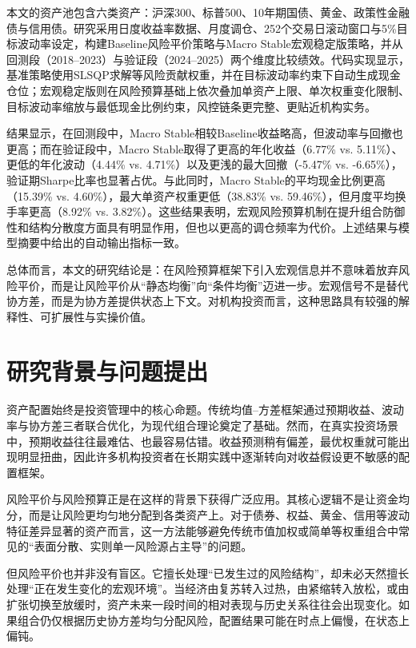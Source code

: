 \documentclass[12pt,a4paper]{ctexart}
\begin{document}
本文的资产池包含六类资产：沪深300、标普500、10年期国债、黄金、政策性金融债与信用债。研究采用日度收益率数据、月度调仓、252个交易日滚动窗口与5\%目标波动率设定，构建Baseline风险平价策略与Macro Stable宏观稳定版策略，并从回测段（2018--2023）与验证段（2024--2025）两个维度比较绩效。代码实现显示，基准策略使用SLSQP求解等风险贡献权重，并在目标波动率约束下自动生成现金仓位；宏观稳定版则在风险预算基础上依次叠加单资产上限、单次权重变化限制、目标波动率缩放与最低现金比例约束，风控链条更完整、更贴近机构实务。

结果显示，在回测段中，Macro Stable相较Baseline收益略高，但波动率与回撤也更高；而在验证段中，Macro Stable取得了更高的年化收益（6.77\% vs. 5.11\%）、更低的年化波动（4.44\% vs. 4.71\%）以及更浅的最大回撤（-5.47\% vs. -6.65\%），验证期Sharpe比率也显著占优。与此同时，Macro Stable的平均现金比例更高（15.39\% vs. 4.60\%），最大单资产权重更低（38.83\% vs. 59.46\%），但月度平均换手率更高（8.92\% vs. 3.82\%）。这些结果表明，宏观风险预算机制在提升组合防御性和结构分散度方面具有明显作用，但也以更高的调仓频率为代价。上述结果与模型摘要中给出的自动输出指标一致。

总体而言，本文的研究结论是：在风险预算框架下引入宏观信息并不意味着放弃风险平价，而是让风险平价从“静态均衡”向“条件均衡”迈进一步。宏观信号不是替代协方差，而是为协方差提供状态上下文。对机构投资而言，这种思路具有较强的解释性、可扩展性与实操价值。

\newpage

\section{研究背景与问题提出}

资产配置始终是投资管理中的核心命题。传统均值--方差框架通过预期收益、波动率与协方差三者联合优化，为现代组合理论奠定了基础。然而，在真实投资场景中，预期收益往往最难估、也最容易估错。收益预测稍有偏差，最优权重就可能出现明显扭曲，因此许多机构投资者在长期实践中逐渐转向对收益假设更不敏感的配置框架。

风险平价与风险预算正是在这样的背景下获得广泛应用。其核心逻辑不是让资金均分，而是让风险更均匀地分配到各类资产上。对于债券、权益、黄金、信用等波动特征差异显著的资产而言，这一方法能够避免传统市值加权或简单等权重组合中常见的“表面分散、实则单一风险源占主导”的问题。

但风险平价也并非没有盲区。它擅长处理“已发生过的风险结构”，却未必天然擅长处理“正在发生变化的宏观环境”。当经济由复苏转入过热，由紧缩转入放松，或由扩张切换至放缓时，资产未来一段时间的相对表现与历史关系往往会出现变化。如果组合仍仅根据历史协方差均匀分配风险，配置结果可能在时点上偏慢，在状态上偏钝。
\end{document}
